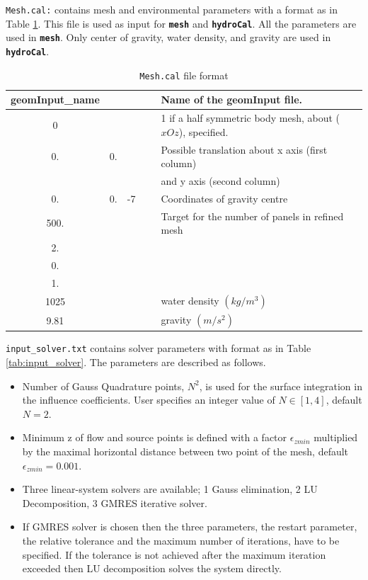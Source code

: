 \documentclass[12pt,a4paper,titlepage]{article}
\begin{document}
\noindent
\texttt{Mesh.cal:} contains mesh and environmental parameters with a format as in Table \ref{tab:meshcal}. This file is used as input for \textbf{\texttt{mesh}} and \textbf{\texttt{hydroCal}}. All the parameters are used in \textbf{\texttt{mesh}}. Only center of gravity, water density, and gravity are used in \textbf{\texttt{hydroCal}}.\\

\begin{table}[ht]
\begin{center}
\caption{\texttt{Mesh.cal} file format}\label{tab:meshcal}
\begin{tabular}{ccccl}
\hline
geomInput\_name &\ &\ &\ & Name of the geomInput file.\\
\hline
0 &\ &\ &\ & 1 if a half symmetric body mesh, about ($xOz$), specified.\\
\hline
0. &0. &\ &\ & Possible translation about x axis (first column)\\
\    &\      &\     &\ & and y axis (second column)\\
\hline
0. &0. &-7 &\ & Coordinates of gravity centre \\ 
\hline
500. &\ &\ &\ & Target for the number of panels in refined mesh \\ 
\hline
2. &\ &\ &\ &  \\ 
\hline
0. &\ &\ &\ &  \\ 
\hline
1. &\ &\ &\ &  \\ 
\hline
1025 &\ &\ &\ & water density $(kg/m^3)$\\
\hline
9.81 &\ &\ &\ &gravity $(m/s^2)$\\
\hline
\end{tabular}
\end{center}
\end{table}

\noindent
\texttt{input\_solver.txt} contains solver parameters with format as in Table \ref{tab:input_solver}. The parameters are described as follows.
\begin{itemize}
\item Number of Gauss Quadrature points, $N^2$, is used for the surface integration in the influence coefficients. User specifies an integer value of $N\in [1,4]$, default $N=2$.
\item Minimum z of flow and source points is defined with a factor  $\epsilon_{zmin}$ multiplied by the maximal horizontal distance between two point of the mesh, default $\epsilon_{zmin}=0.001$. 
\item Three linear-system solvers are available; 1 Gauss elimination, 2 LU Decomposition, 3 GMRES iterative solver.
\item If GMRES solver is chosen then the three parameters, the restart parameter, the relative tolerance and the maximum number of iterations, have to be specified. If the tolerance is not achieved after the maximum iteration exceeded then LU decomposition solves the system directly.\\
\end{itemize}
\end{document}
